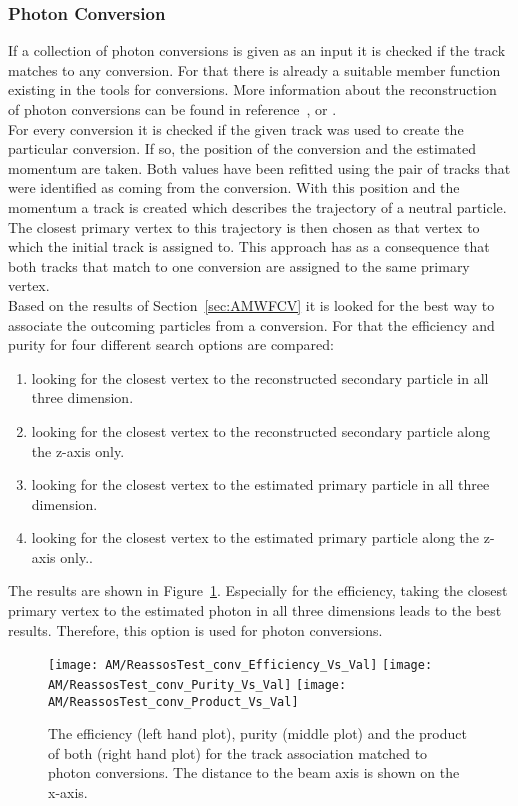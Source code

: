 \subsubsection{Photon Conversion \label{sec:AMWFSVpc}}
If a collection of photon conversions is given as an input it is checked if the track matches to any conversion. For that there is already a suitable member function existing in the tools for conversions. More information about the reconstruction of photon conversions can be found in reference~,  or . \\
For every conversion it is checked if the given track was used to create the particular conversion. If so, the position of the conversion and the estimated momentum are taken. Both values have been refitted using the pair of tracks that were identified as coming from the conversion. With this position and the momentum a track is created which describes the trajectory of a neutral particle. The closest primary vertex to this trajectory is then chosen as that vertex to which the initial track is assigned to.  This approach has as a consequence that both tracks that match to one conversion are assigned to the same primary vertex. \\
Based on the results of Section~\ref{sec:AMWFCV} it is looked for the best way to associate the outcoming particles from a conversion. For that the efficiency and purity for four different search options are compared: 
\begin{enumerate}
\item looking for the closest vertex to the reconstructed secondary particle in all three dimension.
\item looking for the closest vertex to the reconstructed secondary particle along the z-axis only.
\item looking for the closest vertex to the estimated primary particle in all three dimension.
\item looking for the closest vertex to the estimated primary particle along the z-axis only..
\end{enumerate}
The results are shown in Figure~\ref{plot:AMWFSVpcEffAndPurSO}. Especially for the efficiency, taking the closest primary vertex to the estimated photon in all three dimensions leads to the best results. Therefore, this option is used for photon conversions.

\begin{figure}[!ht]
  \centering
  \texttt{[image: AM/ReassosTest\_conv\_Efficiency\_Vs\_Val]}
  \texttt{[image: AM/ReassosTest\_conv\_Purity\_Vs\_Val]}
  \texttt{[image: AM/ReassosTest\_conv\_Product\_Vs\_Val]}
  \caption[Efficiency, purity and their product of the association with photon conversions for different search options as a function of distance to the beam axis]{The efficiency (left hand plot), purity (middle plot) and the product of both (right hand plot) for the track association matched to photon conversions. The distance to the beam axis is shown on the x-axis.\label{plot:AMWFSVpcEffAndPurSO}}
\end{figure}

